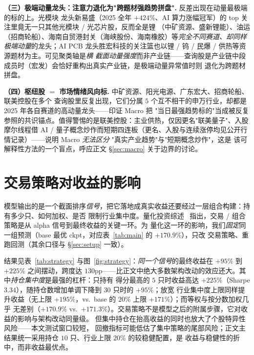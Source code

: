 \documentclass[a4paper,11pt,fontset=fandol]{ctexart}
\begin{document}
\textbf{\heiti（三）极端动量龙头：注意力退化为"跨题材强趋势拼盘".} 反差出现在动量最极端的标的上。光模块
龙头新易盛（2025 全年 $+424\%$、AI 算力涨幅冠军）的 top 关注里竟无一只其他光模块 / 光芯片股，反而全是锂
（中矿资源、盛新锂能）、油运（招商轮船）、海南自贸港封关（海峡股份、海南橡胶）等\emph{完全不同赛道、却同样
极端动量}的龙头；AI PCB 龙头胜宏科技的关注篮也以锂 / 钨 / 民爆 / 供热等资源题材为主。可见聚类轴是\emph{横
截面动量强度}而非产业链——查询股是产业链中段成员时（宏发）会恰好重构出真实产业链，是极端动量异常值时则
退化为跨题材拼盘。

\textbf{\heiti（四）枢纽股 $=$ 市场情绪风向标.} 中矿资源、阳光电源、广东宏大、招商轮船、联美控股在多个
查询股里反复出现，它们分属 $5$ 个互不相干的申万行业，却都是 2025 年各自赛道的高动量龙头——印证 Macro 把
"当日最强趋势标的"当成被反复参照的共识锚点。值得警惕的是联美控股：主业供热，仅因更名"联美量子"、入股
摩尔线程借 AI / 量子概念炒作而短期四连板（更名、入股与连续涨停均见公开行情记录）——说明 Macro \emph{无法区分}
"真实产业趋势"与"短期概念炒作"，这是
该可解释性方法的一个盲点，呼应正文 §\ref{sec:macro} 关于边界的讨论。

\section{交易策略对收益的影响}\label{sec:strategy}
模型输出的是一个截面排序\emph{信号}，把它落地成真实收益还要经过一层组合构建：持有多少只、如何加权、是否
限制行业集中度。量化投资综述~\cite{survey} 指出，交易 / 组合策略是从 alpha 信号到最终收益的关键一环。为
量化这一环的影响，我们\emph{固定}同一组预测（base 最优 ckpt，对应表~\ref{tab:main} 的 $+170.9\%$），只改
交易策略、重跑回测（其余口径与 §\ref{sec:setup} 一致）。

结果见表~\ref{tab:strategy} 与图~\ref{fig:strategy}：\emph{同一个信号}的最终收益在 $+95\%$ 到 $+225\%$
之间摆动，跨度达 $130$pp——比正文中绝大多数架构改动的效应还大。其中\emph{持仓集中度}是最强的杠杆：只持有
得分最高的 $5$ 只时收益高达 $+225\%$（Sharpe $3.34$），随持仓数增加单调下降到 $30$ 只时的 $+95\%$；放宽
行业集中度上限同样提升收益（无上限 $+195\%$，vs.\ base 的 $20\%$ 上限 $+171\%$）；而等权与按分数加权几乎
无差别（$+170.9\%$ vs.\ $+171.3\%$）。交易策略不是模型之后的附属步骤，它对收益的影响与架构改动同量级。
但集中持仓在抬高收益的同时也放大了个股特异性风险——本文测试窗口较短，
回撤指标可能低估了集中策略的尾部风险；正文主结果统一采用持仓 $10$ 只、行业上限 $20\%$ 的较稳健配置，是
收益与稳健性的折中，而非收益最优点。
\end{document}
